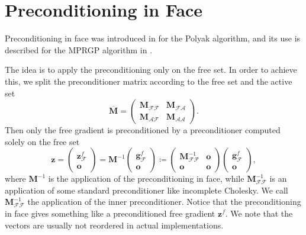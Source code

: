 \documentclass[11pt]{article}
\theoremstyle{plain}
\theoremstyle{definition}
\newcommand{\Vg}{\bm{g}}
\newcommand{\Vo}{\bm{o}}
\newcommand{\Vz}{\bm{z}}
\newcommand{\MM}{\bm{M}}
\begin{document}
\section{Preconditioning in Face}
\label{sec:facepre}
Preconditioning in face was introduced in \cite{Oleary1980} for the Polyak algorithm, and its use is described for the MPRGP algorithm in \cite{Dos-book-09}.

The idea is to apply the preconditioning only on the free set.
In order to achieve this, we split the preconditioner matrix according to the free set and the active set
\begin{equation}
  \label{eq:split}
  \overline{\MM} = \begin{pmatrix}
   \MM_{\mathcal{F}\mathcal{F}} & \MM_{\mathcal{F}\mathcal{A}} \\
   \MM_{\mathcal{A}\mathcal{F}} & \MM_{\mathcal{A}\mathcal{A}}
 \end{pmatrix}.
\end{equation}
Then only the free gradient is preconditioned by a preconditioner computed solely on the free set
\begin{equation}
  \label{eq:prec}
  \Vz = \begin{pmatrix}
    \Vz^f_\mathcal{F}\\
    \Vo
  \end{pmatrix} =
  \MM^{-1}
 \begin{pmatrix}
 \Vg^f_\mathcal{F} \\ \Vo
 \end{pmatrix} \coloneq
 \begin{pmatrix}
   \MM_{\mathcal{F}\mathcal{F}}^{-1} & \Vo \\
   \Vo & \Vo
 \end{pmatrix}
 \begin{pmatrix}
 \Vg^f_\mathcal{F} \\ \Vo
 \end{pmatrix},
\end{equation}
where $\MM^{-1}$ is the application of the preconditioning in face, while $\MM_{\mathcal{F}\mathcal{F}}^{-1}$ is an application of some standard preconditioner like incomplete Cholesky.
We call $\MM_{\mathcal{F}\mathcal{F}}^{-1}$ the application of the inner preconditioner.
Notice that the preconditioning in face gives something like a preconditioned free gradient $\Vz^f$.
We note that the vectors are usually not reordered in actual implementations.
\end{document}
